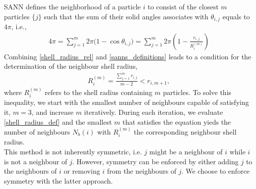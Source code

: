\documentclass{article}
\begin{document}
SANN defines the neighborhood of a particle $i$ to consist of the closest $m$ particles $\{j\}$ such that the sum of their solid angles associates with $\theta_{i,j}$ equals to $4\pi$, i.e.,
\begin{align}
	4\pi=\sum_{j=1}^m2\pi\big(1-\cos\theta_{i,j}\big)=\sum_{j=1}^m2\pi\left(1-\frac{r_{i,j}}{R_i^{(m)}}\right)
	\label{sanns_definitions}
\end{align}
Combining \eqref{shell_radius_rel} and \eqref{sanns_definitions} leads to a condition for the determination of the neighbour shell radius,
\begin{align}
	R_i^{(m)}=\frac{\sum_{j=1}^m r_{i,j}}{m-2}<r_{i,m+1},
	\label{shell_radius_def}
\end{align}
where $R_i^{(m)}$ refers to the shell radius containing $m$ particles. To solve this inequality, we start with the smallest number of neighbours capable of satisfying it, $m=3$, and increase $m$ iteratively. During each iteration, we evaluate \eqref{shell_radius_def} and the smallest $m$ that satisfies the equation yieds the number of neighbours $N_b(i)$ with $R_i^{(m)}$ the corresponding neighbour shell radius. 
\\

This method is not inherently symmetric, i.e. $j$ might be a neighbour of $i$ while $i$ is not a neighbour of $j$. However, symmetry can be enforced by either adding $j$ to the neighbours of $i$ or removing $i$ from the neighbours of $j$. We choose to enforce symmetry with the latter approach.
\end{document}
